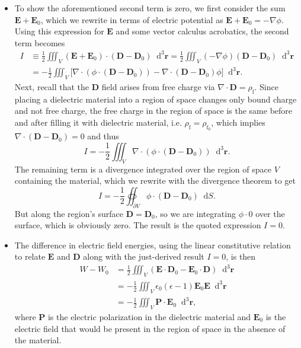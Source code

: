 \documentclass[11pt, a4paper]{article}
\newcommand{\diff}{\mathop{}\!\mathrm{d}} %
\newcommand{\dr}{\diff^{3} \r}  %
\renewcommand{\vec}[1]{\bm{#1}} %
\renewcommand{\r}{\vec{r}}
\newcommand{\E}{\vec{E}} %
\newcommand{\D}{\vec{D}}  %
\renewcommand{\P}{\vec{P}}  %
\newcommand{\ee}{\epsilon_{0}}  %
\renewcommand{\div}{\nabla \cdot}
\renewcommand{\grad}{\nabla}
\begin{document}
\begin{itemize}
    \item To show the aforementioned second term is zero, we first consider the sum $ \E + \E_{0} $, which we rewrite in terms of electric potential as $ \E + \E_{0} = - \grad \phi $. Using this expression for $ \E $ and some vector calculus acrobatics, the second term becomes
	\begin{align*}
        I & \equiv \frac{1}{2}\iiint_{V}(\E + \E_{0})\cdot (\D - \D_{0})\dr = \frac{1}{2}\iiint_{V} (- \grad \phi)(\D - \D_{0}) \dr \\
        & = -\frac{1}{2}\iiint_{V}\big[\div (\phi \cdot (\D - \D_{0})) - \div (\D - \D_{0})\phi \big]\dr.
	\end{align*}
    Next, recall that the $ \D $ field arises from free charge via $ \div \D = \rho_{\text{f}} $. Since placing a dielectric material into a region of space changes only bound charge and not free charge, the free charge in the region of space is the same before and after filling it with dielectric material, i.e. $ \rho_{\text{f}} = \rho_{\text{f}_{0}}$, which implies $ \div (\D - \D_{0}) = 0 $ and thus
    \begin{equation*}
        I = -\frac{1}{2}\iiint_{V}\div (\phi \cdot (\D - \D_{0}))\dr.
    \end{equation*}
	The remaining term is a divergence integrated over the region of space $ V $ containing the material, which we rewrite with the divergence theorem to get
	\begin{equation*}
        I = -\frac{1}{2}\oiint_{\partial V} \phi \cdot (\D - \D_{0})\diff S.
	\end{equation*}
    But along the region's surface $ \D = \D_{0} $, so we are integrating $ \phi \cdot 0 $ over the surface, which is obviously zero. The result is the quoted expression $ I = 0 $.
	
    \item The difference in electric field energies, using the linear constitutive relation to relate $ \E $ and $ \D $ along with the just-derived result $ I = 0 $, is then
	\begin{align*}
		W - W_{0}  &= \frac{1}{2}\iiint_{V}(\E \cdot \D_{0} - \E_{0}\cdot\D)\dr\\
		& = - \frac{1}{2}\iiint_{V} \ee(\epsilon - 1)\E_{0}\E \dr\\
		& = -\frac{1}{2}\iiint_{V}\P \cdot \E_{0}\dr,
	\end{align*}
	where $ \P $ is the electric polarization in the dielectric material and $ \E_{0} $ is the electric field that would be present in the region of space in the absence of the material.
	
	
	
\end{itemize}
\end{document}
